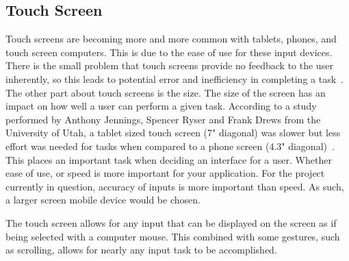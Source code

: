 \documentclass[10pt,draftclsnofoot,onecolumn,letterpaper]{IEEEtran}
\begin{document}
\subsection{Touch Screen}
Touch screens are becoming more and more common with tablets, phones, and touch screen computers. This is due to the ease of use for these input devices. There is the small problem that touch screens provide no feedback to the user inherently, so this leads to potential error and inefficiency in completing a task~\cite{TouchScreen}. The other part about touch screens is the size. The size of the screen has an impact on how well a user can perform a given task. According to a study performed by Anthony Jennings, Spencer Ryser and Frank Drews from the University of Utah, a tablet sized touch screen (7" diagonal) was slower but less effort was needed for tasks when compared to a phone screen (4.3" diagonal)~\cite{TouchScreen}. This places an important task when deciding an interface for a user. Whether ease of use, or speed is more important for your application. For the project currently in question, accuracy of inputs is more important than speed. As such, a larger screen mobile device would be chosen.\par
The touch screen allows for any input that can be displayed on the screen as if being selected with a computer mouse. This combined with some gestures, such as scrolling, allows for nearly any input task to be accomplished.\par
\end{document}
